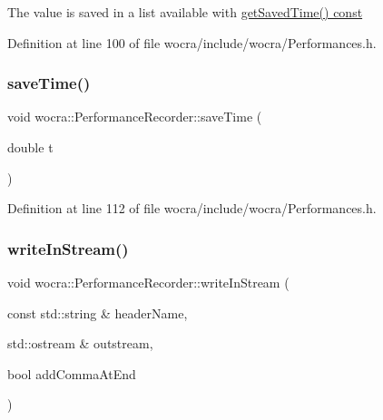 The value is saved in a list available with \hyperlink{classwocra_1_1PerformanceRecorder_a7e27ca829190c70a8a3ce782c409a8ce}{get\+Saved\+Time() const} 

Definition at line 100 of file wocra/include/wocra/\+Performances.\+h.

\hypertarget{classwocra_1_1PerformanceRecorder_a97a89d1cf9f994da4059cba8cb3b21ee}{}\label{classwocra_1_1PerformanceRecorder_a97a89d1cf9f994da4059cba8cb3b21ee} 
\subsubsection{\texorpdfstring{save\+Time()}{saveTime()}}
{\footnotesize\ttfamily void wocra\+::\+Performance\+Recorder\+::save\+Time (\begin{DoxyParamCaption}\item[{double}]{t }\end{DoxyParamCaption})\hspace{0.3cm}{\ttfamily [inline]}}



Definition at line 112 of file wocra/include/wocra/\+Performances.\+h.

\hypertarget{classwocra_1_1PerformanceRecorder_a9b2a77a8d2598dbf76eb578b43b9a17d}{}\label{classwocra_1_1PerformanceRecorder_a9b2a77a8d2598dbf76eb578b43b9a17d} 
\subsubsection{\texorpdfstring{write\+In\+Stream()}{writeInStream()}}
{\footnotesize\ttfamily void wocra\+::\+Performance\+Recorder\+::write\+In\+Stream (\begin{DoxyParamCaption}\item[{const std\+::string \&}]{header\+Name,  }\item[{std\+::ostream \&}]{outstream,  }\item[{bool}]{add\+Comma\+At\+End }\end{DoxyParamCaption})\hspace{0.3cm}{\ttfamily [inline]}}

